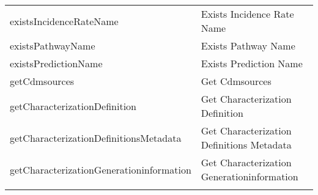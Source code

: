 \documentclass[
]{article}
\begin{document}
\begin{longtable}[]{@{}ll@{}}
\begin{minipage}[t]{0.46\columnwidth}
existsIncidenceRateName\strut
\end{minipage} & \begin{minipage}[t]{0.48\columnwidth}\raggedright
Exists Incidence Rate Name\strut
\end{minipage}\tabularnewline
\begin{minipage}[t]{0.46\columnwidth}\raggedright
existsPathwayName\strut
\end{minipage} & \begin{minipage}[t]{0.48\columnwidth}\raggedright
Exists Pathway Name\strut
\end{minipage}\tabularnewline
\begin{minipage}[t]{0.46\columnwidth}\raggedright
existsPredictionName\strut
\end{minipage} & \begin{minipage}[t]{0.48\columnwidth}\raggedright
Exists Prediction Name\strut
\end{minipage}\tabularnewline
\begin{minipage}[t]{0.46\columnwidth}\raggedright
getCdmsources\strut
\end{minipage} & \begin{minipage}[t]{0.48\columnwidth}\raggedright
Get Cdmsources\strut
\end{minipage}\tabularnewline
\begin{minipage}[t]{0.46\columnwidth}\raggedright
getCharacterizationDefinition\strut
\end{minipage} & \begin{minipage}[t]{0.48\columnwidth}\raggedright
Get Characterization Definition\strut
\end{minipage}\tabularnewline
\begin{minipage}[t]{0.46\columnwidth}\raggedright
getCharacterizationDefinitionsMetadata\strut
\end{minipage} & \begin{minipage}[t]{0.48\columnwidth}\raggedright
Get Characterization Definitions Metadata\strut
\end{minipage}\tabularnewline
\begin{minipage}[t]{0.46\columnwidth}\raggedright
getCharacterizationGenerationinformation\strut
\end{minipage} & \begin{minipage}[t]{0.48\columnwidth}\raggedright
Get Characterization Generationinformation\strut
\end{minipage}\tabularnewline
\begin{minipage}[t]{0.46\columnwidth}\raggedright

\end{minipage}
\end{longtable}
\end{document}

